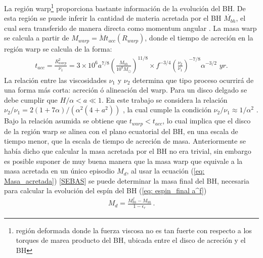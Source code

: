 La región warp\footnote{región deformada donde la fuerza viscosa no es tan fuerte con respecto a los torques de marea producto del BH, ubicada entre el disco de acreción y el BH} proporciona bastante información de la evolución del BH. De esta región se puede inferir la cantidad de materia acretada por el BH $\dot{M_{bh}}$, el cual sera transferido de manera directa como momentum angular \cite{volonteri2007}. La masa warp se calcula a partir de $M_{warp}=\dot{M}t_{acc}(R_{warp})$, donde el tiempo de acreción en la región warp se calcula de la forma:
%
\begin{align}
 t_{acc}=\frac{R^{2}_{warp}}{\nu_{1}} = 3 \times10^{6}a^{7/8} \left(\frac{M_{bh}}{10^{8}M_{\odot}} \right)^{11/8}\times f^{-3/4}\left( \frac{\nu_{2}}{\nu_{1}}\right)^{-7/8}\alpha^{-3/2}\,\, \textit{yr}.
\end{align}
%
La relación entre las viscosidades $\nu_1$ y $\nu_2$ determina que tipo proceso ocurrirá de una forma más corta: acreción ó alineación del warp. Para un disco delgado se debe cumplir que $H/\alpha < a \ll 1$. En este trabajo se considera la relación $\nu_{2}/\nu_{1}=2(1+7\alpha)/(\alpha^{2}(4+a^{2}))$ \cite{ogilvie1999} , la cual cumple la condición $\nu_{2}/\nu_{1}\approx 1/\alpha^{2}$ \cite{papaloizou1983}. Bajo la relación asumida se obtiene que $t_{warp}< t_{acc}$, lo cual implica que el disco de la región warp se alinea con el plano ecuatorial del BH, en una escala de tiempo menor, que la escala de tiempo de acreción de masa. Anteriormente se había dicho que calcular la masa acretada por el BH no era trivial, sin embargo es posible suponer de muy buena manera que la masa warp que equivale a la masa acretada en un único episodio $M_{d}$, al usar la ecuación (\ref{eq: Masa_acretada}) [{\underline{SEBAS}}] se puede determinar la masa final del BH, necesaria para calcular la evolución del espín del BH (\ref{eq: espin_final a^f})
%
\begin{align}
 M_{d}= \frac{M_{bh}^{f}-M_{bh}}{1-\epsilon_{r}}\,.
 \label{eq: Masa_acretada}
\end{align}
%
